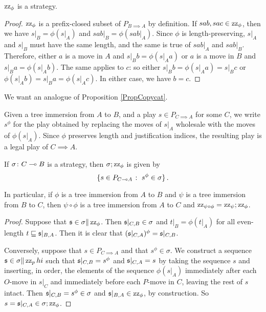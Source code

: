 \begin{proposition}
  $\operatorname{zz}_\phi$ is a strategy.  
\end{proposition}
\begin{proof}
  $\operatorname{zz}_\phi$ is a prefix-closed subset of $P_{B\implies A}$ by definition.  
  If $sab,sac\in\operatorname{zz}_\phi$, then we have $s\vert_B=\phi(s\vert_A)$ and $sab\vert_B=\phi(sab\vert_A)$.
  Since $\phi$ is length-preserving, $s\vert_A$ and $s\vert_B$ must have the same length, and the same is true of $sab\vert_A$ and $sab\vert_B$.  
  Therefore, either $a$ is a move in $A$ and $s\vert_Bb=\phi(s\vert_Aa)$ or $a$ is a move in $B$ and $s\vert_Ba=\phi(s\vert_Ab)$.  
  The same applies to $c$: so either $s\vert_Bb=\phi(s\vert_Aa)=s\vert_Bc$ or $\phi(s\vert_Ab)=s\vert_Ba=\phi(s\vert_Ac)$.  
  In either case, we have $b=c$.
\end{proof}

We want an analogue of Proposition \ref{PropCopycat}.

\begin{definition}
  Given a tree immersion from $A$ to $B$, and a play $s\in P_{C\implies A}$ for some $C$, we write $s^\phi$ for the play obtained by replacing the moves of $s\vert_A$ wholesale with the moves of $\phi(s\vert_A)$.  
  Since $\phi$ preserves length and justification indices, the resulting play is a legal play of $C\implies A$.
\end{definition}

\begin{proposition}
  If $\sigma\colon C \multimap B$ is a strategy, then $\sigma;\operatorname{zz}_\phi$ is given by
  \[
    \{s\in P_{C\multimap A}\;\colon\; s^\phi\in\sigma\}\,.
    \]

  In particular, if $\phi$ is a tree immersion from $A$ to $B$ and $\psi$ is a tree immersion from $B$ to $C$, then $\psi\circ\phi$ is a tree immersion from $A$ to $C$ and $\operatorname{zz}_{\psi\circ\phi}=\operatorname{zz}_\psi;\operatorname{zz}_\phi$.
  \label{PropTree}
\end{proposition}
\begin{proof}
  Suppose that $\mathfrak s\in\sigma\|\operatorname{zz}_\phi$.  
  Then $\mathfrak s\vert_{C,B}\in\sigma$ and $t\vert_B=\phi(t\vert_A)$ for all even-length $t\sqsubseteq \mathfrak s\vert_{B,A}$.  
  Then it is clear that $(\mathfrak s\vert_{C,A})^\phi=\mathfrak s\vert_{C,B}$.  

  Conversely, suppose that $s\in P_{C\implies A}$ and that $s^\phi\in\sigma$.  
  We construct a sequence $\mathfrak s\in\sigma\|\operatorname{zz}_phi$ such that $\mathfrak s\vert_{C,B}=s^\phi$ and $\mathfrak s\vert_{C,A}=s$ by taking the sequence $s$ and inserting, in order, the elements of the sequence $\phi(s\vert_A)$ immediately after each $O$-move in $s\vert_C$ and immediately before each $P$-move in $C$, leaving the rest of $s$ intact.  
  Then $\mathfrak s\vert_{C,B}=s^\phi\in\sigma$ and $\mathfrak s\vert_{B,A}\in\operatorname{zz}_\phi$, by construction.  
  So $s=\mathfrak s\vert_{C,A}\in \sigma;\operatorname{zz}_\phi$.
\end{proof}

